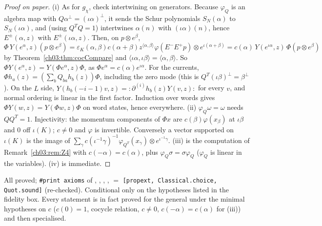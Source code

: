 \begin{proof}[Proof on paper]
(i) As for $g_\chi$, check intertwining on generators. Because $\varphi_Q$ is an algebra map with
$Q\alpha^\perp=(\iota\alpha)^\perp$, it sends the Schur polynomials $S_N(\alpha)$ to
$S_N(\iota\alpha)$, and (using $Q^TQ=1$) intertwines $\alpha(n)$ with $(\iota\alpha)(n)$, hence
$E^\pm(\alpha,z)$ with $E^\pm(\iota\alpha,z)$. Then, on $p\otimes e^\beta$,
\begin{equation*}
 \Phi\,Y(e^\alpha,z)(p\otimes e^\beta)=\varepsilon_K(\alpha,\beta)c(\alpha+\beta)z^{\langle\alpha,\beta
 \rangle}\varphi(E^-E^+p)\otimes e^{\iota(\alpha+\beta)}
 =c(\alpha)\,Y(e^{\iota\alpha},z)\,\Phi(p\otimes e^\beta)
\end{equation*}
by Theorem~\ref{ch03:thm:cocCompare} and $\langle\iota\alpha,\iota\beta\rangle=\langle\alpha,
\beta\rangle$. So $\Phi Y(e^\alpha,z)=Y(\Phi e^\alpha,z)\Phi$, as $\Phi e^\alpha=c(\alpha)
e^{\iota\alpha}$. For the currents, $\Phi h_a(z)=(\sum_bQ_{ba}h_b(z))\Phi$, including the zero mode
(this is $Q^T(\iota\beta)^\perp=\beta^\perp$). On the $L$ side, $Y(h_b(-i-1)v,z)={:}\partial^{(i)}
h_b(z)Y(v,z){:}$ for every $v$, and normal ordering is linear in the first factor. Induction over
words gives $\Phi Y(w,z)=Y(\Phi w,z)\Phi$ on word states, hence everywhere.
(ii) $\varphi_Q\omega=\omega$ needs $QQ^T=1$. Injectivity: the momentum components of
$\Phi x$ are $c(\beta)\varphi(x_\beta)$ at $\iota\beta$ and $0$ off $\iota(K)$; $c\neq0$ and
$\varphi$ is invertible. Conversely a vector supported on $\iota(K)$ is the image of
$\sum_\gamma c(\iota^{-1}\gamma)^{-1}\varphi_{Q^T}(x_\gamma)\otimes e^{\iota^{-1}\gamma}$.
(iii) is the computation of Remark~\ref{ch03:rem:Z4} with $c(-\alpha)=c(\alpha)$, plus
$\varphi_Q\sigma=\sigma\varphi_Q$ ($\varphi_Q$ is linear in the variables). (iv) is immediate.
\end{proof}

\begin{status}
All proved; \texttt{\#print axioms} of , ,
, , 
$=$ \texttt{[propext, Classical.choice, Quot.sound]} (re-checked). Conditional only on the
hypotheses listed in the fidelity box. Every statement is in fact proved for the general
 under the minimal hypotheses on $c$ ($c(0)=1$, cocycle relation, $c\ne0$,
$c(-\alpha)=c(\alpha)$ for (iii)) and then specialised.
\end{status}

